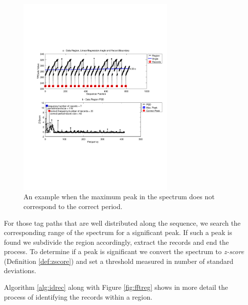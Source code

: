 \vspace{-0.3cm}

\begin{figure}[h]
  \centering
     \includegraphics[trim={2.5cm 7.5cm 1cm 6.5cm}, width=220pt
     ]{img/fftleak.pdf}
  \caption{\small{An example when the maximum peak in the spectrum does not correspond to the correct period.}}
  \label{fig:fftleak}
\end{figure}

\vspace{-0.3cm}

For those tag paths that are well distributed along the sequence, we search the
corresponding range of the spectrum for a significant peak. If such a peak is
found we subdivide the region accordingly, extract the records and end the
process. To determine if a peak is significant we convert the spectrum to
\textit{z-score} (Definition \ref{def:zscore}) and set a threshold measured in
number of standard deviations.

Algorithm \ref{alg:idrec} along with Figure \ref{fig:fftreg} shows in more
detail the process of identifying the records within a region.

\vspace{-0.3cm}

